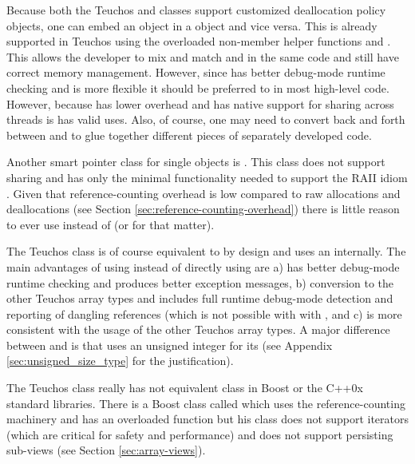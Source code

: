 \documentclass[pdf,ps2pdf,11pt]{SANDreport}
\begin{document}
Because both the Teuchos {} and {}
classes support customized deallocation policy objects, one can embed
an {} object in a {} object and vice
versa.  This is already supported in Teuchos using the overloaded
non-member helper functions {} and {}.  This allows the developer to mix and match
{} and {} in the same code and still
have correct memory management.  However, since {} has better
debug-mode runtime checking and is more flexible it should be preferred
to {} in most high-level code.  However,
because {} has lower overhead and has native
support for sharing across threads is has valid uses.  Also, of
course, one may need to convert back and forth between {} and
{} to glue together different pieces of
separately developed code.

Another smart pointer class for single objects is
{}.  This class does not support sharing and has
only the minimal functionality needed to support the RAII idiom
{}\cite[Item 13]{C++CodingStandards05}.  Given that reference-counting
overhead is low compared to raw allocations and deallocations (see
Section {}\ref{sec:reference-counting-overhead}) there is little
reason to ever use {} instead of {} (or
{} for that matter).

The Teuchos class {} is of course equivalent to
{} by design and uses an {}
internally.  The main advantages of using {} instead of
directly using {} are a) {} has better
debug-mode runtime checking and produces better exception messages, b)
conversion to the other Teuchos array types {} and
{} includes full runtime debug-mode detection and
reporting of dangling references (which is not possible with with
{}, and c) is more consistent with the usage of the
other Teuchos array types.  A major difference between {}
and {} is that {} uses an unsigned integer
for its {} (see Appendix
{}\ref{sec:unsigned_size_type} for the justification).

The Teuchos class {} really has not equivalent class in
Boost or the C++0x standard libraries.  There is a Boost class called
{} which uses the {}
reference-counting machinery and has an overloaded
{} function but his class does not support
iterators (which are critical for safety and performance) and does not
support persisting sub-views (see Section {}\ref{sec:array-views}).
\end{document}
